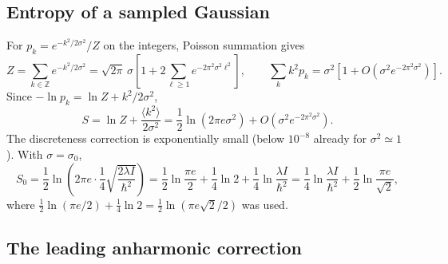 \documentclass[preprint,12pt]{elsarticle}
\begin{document}
\subsection{Entropy of a sampled Gaussian}

For $p_{k}=e^{-k^{2}/2\sigma^{2}}/Z$ on the integers, Poisson summation gives
\begin{equation}
Z=\sum_{k\in\mathbb{Z}}e^{-k^{2}/2\sigma^{2}}
=\sqrt{2\pi}\,\sigma\left[1+2\sum_{\ell\ge1}e^{-2\pi^{2}\sigma^{2}\ell^{2}}\right],
\qquad
\sum_{k}k^{2}p_{k}=\sigma^{2}\left[1+O\!\left(\sigma^{2}e^{-2\pi^{2}\sigma^{2}}\right)\right].
\end{equation}
Since $-\ln p_{k}=\ln Z+k^{2}/2\sigma^{2}$,
\begin{equation}
S=\ln Z+\frac{\langle k^{2}\rangle}{2\sigma^{2}}
=\frac12\ln\left(2\pi e\sigma^{2}\right)
+O\!\left(\sigma^{2}e^{-2\pi^{2}\sigma^{2}}\right).
\end{equation}
The discreteness correction is exponentially small (below $10^{-8}$ already for
$\sigma^{2}\simeq1$). With $\sigma=\sigma_{0}$,
\begin{equation}
S_{0}=\frac12\ln\left(2\pi e\cdot\frac14\sqrt{\frac{2\lambda I}{\hbar^{2}}}\right)
=\frac12\ln\frac{\pi e}{2}+\frac14\ln2+\frac14\ln\frac{\lambda I}{\hbar^{2}}
=\frac14\ln\frac{\lambda I}{\hbar^{2}}+\frac12\ln\frac{\pi e}{\sqrt2},
\end{equation}
where $\tfrac12\ln(\pi e/2)+\tfrac14\ln2=\tfrac12\ln(\pi e\sqrt2/2)$ was used.

\subsection{The leading anharmonic correction}
\end{document}
